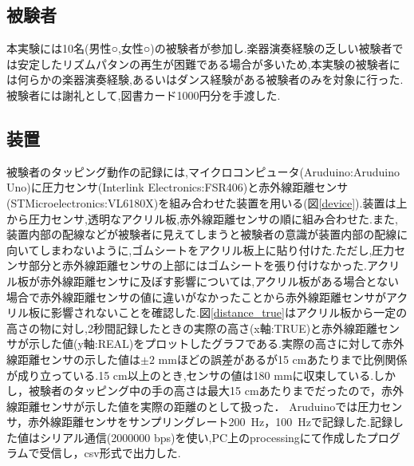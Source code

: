 \documentclass[12pt]{jarticle}
\begin{document}
\subsection{被験者}
本実験には10名(男性○,女性○)の被験者が参加し.楽器演奏経験の乏しい被験者では安定したリズムパタンの再生が困難である場合が多いため,本実験の被験者には何らかの楽器演奏経験,あるいはダンス経験がある被験者のみを対象に行った.被験者には謝礼として,図書カード1000円分を手渡した.

\subsection{装置}
被験者のタッピング動作の記録には,マイクロコンピュータ(Aruduino:Aruduino Uno)に圧力センサ(Interlink Electronics:FSR406)と赤外線距離センサ(STMicroelectronics:VL6180X)を組み合わせた装置を用いる(図\ref{device}).装置は上から圧力センサ,透明なアクリル板,赤外線距離センサの順に組み合わせた.また,装置内部の配線などが被験者に見えてしまうと被験者の意識が装置内部の配線に向いてしまわないように,ゴムシートをアクリル板上に貼り付けた.ただし,圧力センサ部分と赤外線距離センサの上部にはゴムシートを張り付けなかった.アクリル板が赤外線距離センサに及ぼす影響については,アクリル板がある場合とない場合で赤外線距離センサの値に違いがなかったことから赤外線距離センサがアクリル板に影響されないことを確認した.図\ref{distance_true}はアクリル板から一定の高さの物に対し,2秒間記録したときの実際の高さ(x軸:TRUE)と赤外線距離センサが示した値(y軸:REAL)をプロットしたグラフである.実際の高さに対して赤外線距離センサの示した値は$\pm{2}$ mmほどの誤差があるが15 cmあたりまで比例関係が成り立っている.15 cm以上のとき,センサの値は180 mmに収束している.しかし，被験者のタッピング中の手の高さは最大15 cmあたりまでだったので，赤外線距離センサが示した値を実際の距離のとして扱った．
Aruduinoでは圧力センサ，赤外線距離センサをサンプリングレート200\ Hz，100\ Hzで記録した.記録した値はシリアル通信(2000000 bps)を使い,PC上のprocessingにて作成したプログラムで受信し，csv形式で出力した.
\end{document}
